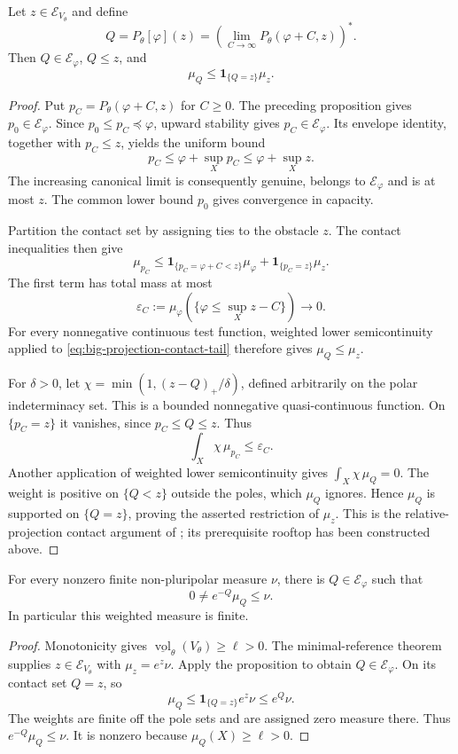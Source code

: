 \begin{proposition}\label{prop:big-relative-projection}
Let $z\in\mathcal E_{V_\theta}$ and define
\[
 Q=P_\theta[\varphi](z)
   =\left(\lim_{C\to\infty}P_\theta(\varphi+C,z)\right)^*.
\]
Then $Q\in\mathcal E_\varphi$, $Q\leq z$, and
\[
 \mu_Q\leq\mathbf1_{\{Q=z\}}\mu_z.
\]
\end{proposition}
\begin{proof}
Put $p_C=P_\theta(\varphi+C,z)$ for $C\geq0$. The preceding proposition gives $p_0\in\mathcal E_\varphi$. Since $p_0\leq p_C\preceq\varphi$, upward stability gives $p_C\in\mathcal E_\varphi$. Its envelope identity, together with $p_C\leq z$, yields the uniform bound
\[
 p_C\leq\varphi+\sup_Xp_C\leq\varphi+\sup_Xz.
\]
The increasing canonical limit is consequently genuine, belongs to $\mathcal E_\varphi$ and is at most $z$. The common lower bound $p_0$ gives convergence in capacity.

Partition the contact set by assigning ties to the obstacle $z$. The contact inequalities then give
\begin{equation}\label{eq:big-projection-contact-tail}
 \mu_{p_C}
 \leq\mathbf1_{\{p_C=\varphi+C<z\}}\mu_\varphi
       +\mathbf1_{\{p_C=z\}}\mu_z.
\end{equation}
The first term has total mass at most
\[
 \varepsilon_C:=\mu_\varphi(\{\varphi\leq\sup_Xz-C\})
 \longrightarrow0.
\]
For every nonnegative continuous test function, weighted lower semicontinuity applied to \eqref{eq:big-projection-contact-tail} therefore gives $\mu_Q\leq\mu_z$.

For $\delta>0$, let $\chi=\min(1,(z-Q)_+/\delta)$, defined arbitrarily on the polar indeterminacy set. This is a bounded nonnegative quasi-continuous function. On $\{p_C=z\}$ it vanishes, since $p_C\leq Q\leq z$. Thus
\[
 \int_X\chi\,\mu_{p_C}\leq\varepsilon_C.
\]
Another application of weighted lower semicontinuity gives $\int_X\chi\,\mu_Q=0$. The weight is positive on $\{Q<z\}$ outside the poles, which $\mu_Q$ ignores. Hence $\mu_Q$ is supported on $\{Q=z\}$, proving the asserted restriction of $\mu_z$. This is the relative-projection contact argument of \cite[Proposition 3.3]{XL26}; its prerequisite rooftop has been constructed above.
\end{proof}

\begin{corollary}\label{cor:big-relative-supersolution}
For every nonzero finite non-pluripolar measure $\nu$, there is $Q\in\mathcal E_\varphi$ such that
\[
 0\ne e^{-Q}\mu_Q\leq\nu.
\]
In particular this weighted measure is finite.
\end{corollary}
\begin{proof}
Monotonicity gives $\underline{\operatorname{vol}}_\theta(V_\theta)\geq\ell>0$. The minimal-reference theorem supplies $z\in\mathcal E_{V_\theta}$ with $\mu_z=e^z\nu$. Apply the proposition to obtain $Q\in\mathcal E_\varphi$. On its contact set $Q=z$, so
\[
 \mu_Q\leq\mathbf1_{\{Q=z\}}e^z\nu\leq e^Q\nu.
\]
The weights are finite off the pole sets and are assigned zero measure there. Thus $e^{-Q}\mu_Q\leq\nu$. It is nonzero because $\mu_Q(X)\geq\ell>0$.
\end{proof}
